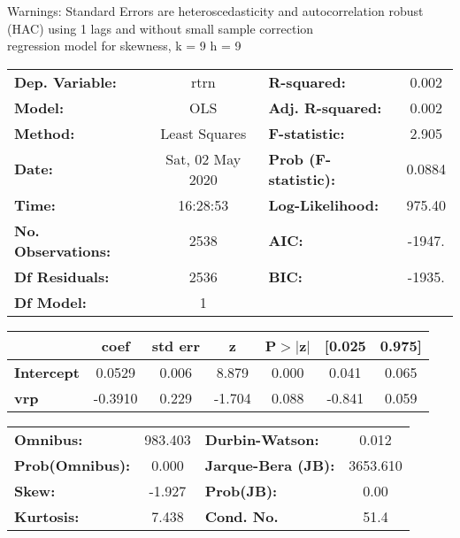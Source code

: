 Warnings: \newline
 [1] Standard Errors are heteroscedasticity and autocorrelation robust (HAC) using 1 lags and without small sample correction\\ 

regression model for skewness, k = 9 h = 9\begin{center}
\begin{tabular}{lclc}
\toprule
\textbf{Dep. Variable:}    &       rtrn       & \textbf{  R-squared:         } &     0.002   \\
\textbf{Model:}            &       OLS        & \textbf{  Adj. R-squared:    } &     0.002   \\
\textbf{Method:}           &  Least Squares   & \textbf{  F-statistic:       } &     2.905   \\
\textbf{Date:}             & Sat, 02 May 2020 & \textbf{  Prob (F-statistic):} &   0.0884    \\
\textbf{Time:}             &     16:28:53     & \textbf{  Log-Likelihood:    } &    975.40   \\
\textbf{No. Observations:} &        2538      & \textbf{  AIC:               } &    -1947.   \\
\textbf{Df Residuals:}     &        2536      & \textbf{  BIC:               } &    -1935.   \\
\textbf{Df Model:}         &           1      & \textbf{                     } &             \\
\bottomrule
\end{tabular}
\begin{tabular}{lcccccc}
                   & \textbf{coef} & \textbf{std err} & \textbf{z} & \textbf{P$> |$z$|$} & \textbf{[0.025} & \textbf{0.975]}  \\
\midrule
\textbf{Intercept} &       0.0529  &        0.006     &     8.879  &         0.000        &        0.041    &        0.065     \\
\textbf{vrp}       &      -0.3910  &        0.229     &    -1.704  &         0.088        &       -0.841    &        0.059     \\
\bottomrule
\end{tabular}
\begin{tabular}{lclc}
\textbf{Omnibus:}       & 983.403 & \textbf{  Durbin-Watson:     } &    0.012  \\
\textbf{Prob(Omnibus):} &   0.000 & \textbf{  Jarque-Bera (JB):  } & 3653.610  \\
\textbf{Skew:}          &  -1.927 & \textbf{  Prob(JB):          } &     0.00  \\
\textbf{Kurtosis:}      &   7.438 & \textbf{  Cond. No.          } &     51.4  \\
\bottomrule
\end{tabular}
\end{center}

